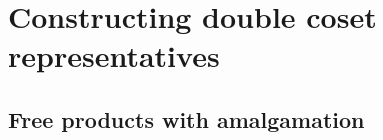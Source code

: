\documentclass[a4paper,12pt]{article}
\numberwithin{equation}{section}
\numberwithin{figure}{section}
\newcommand{\FF}{\ensuremath{\mathbb{F}}}
\newcommand{\la}{\langle}
\newcommand{\ra}{\rangle}
\newcommand{\be}{\begin{enumerate}}
\newcommand{\ee}{\end{enumerate}}
\begin{document}

\section{Constructing double coset representatives}\label{sec:dcforms}
\subsection{Free products with amalgamation}\label{sec:intro}
\end{document}
